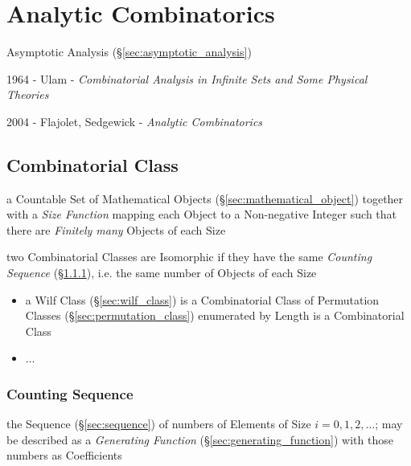 \section{Analytic Combinatorics}\label{sec:analytic_combinatorics}

\cite{flajolet-sedgewick09}

Asymptotic Analysis (\S\ref{sec:asymptotic_analysis})

1964 - Ulam - \emph{Combinatorial Analysis in Infinite Sets and Some Physical
  Theories}

2004 - Flajolet, Sedgewick - \emph{Analytic Combinatorics}



\subsection{Combinatorial Class}\label{sec:combinatorial_class}

a Countable Set of Mathematical Objects (\S\ref{sec:mathematical_object})
together with a \emph{Size Function} mapping each Object to a Non-negative
Integer such that there are \emph{Finitely many} Objects of each Size

two Combinatorial Classes are Isomorphic if they have the same \emph{Counting
  Sequence} (\S\ref{sec:counting_sequence}), i.e. the same number of Objects of
each Size

\begin{itemize}
  \item a Wilf Class (\S\ref{sec:wilf_class}) is a Combinatorial Class of
    Permutation Classes (\S\ref{sec:permutation_class}) enumerated by Length is
    a Combinatorial Class
  \item ...
\end{itemize}



\subsubsection{Counting Sequence}\label{sec:counting_sequence}

the Sequence (\S\ref{sec:sequence}) of numbers of Elements of Size $i = 0, 1, 2,
\ldots$; may be described as a \emph{Generating Function}
(\S\ref{sec:generating_function}) with those numbers as Coefficients

